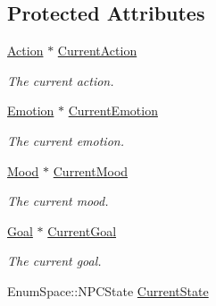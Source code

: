 \subsection*{Protected Attributes}
\begin{DoxyCompactItemize}
\item 
\hypertarget{class_n_p_c_a70f1d72ce96cfe4800a4bb7ce4cb4a8c}{\hyperlink{class_action}{Action} $\ast$ \hyperlink{class_n_p_c_a70f1d72ce96cfe4800a4bb7ce4cb4a8c}{Current\-Action}}\label{class_n_p_c_a70f1d72ce96cfe4800a4bb7ce4cb4a8c}

\begin{DoxyCompactList}\small\item\em The current action. \end{DoxyCompactList}\item 
\hypertarget{class_n_p_c_aacdb21f730d86fb68b70f88bf4a1eefe}{\hyperlink{class_emotion}{Emotion} $\ast$ \hyperlink{class_n_p_c_aacdb21f730d86fb68b70f88bf4a1eefe}{Current\-Emotion}}\label{class_n_p_c_aacdb21f730d86fb68b70f88bf4a1eefe}

\begin{DoxyCompactList}\small\item\em The current emotion. \end{DoxyCompactList}\item 
\hypertarget{class_n_p_c_a46cedade10fa9f48531a52d5d1913b1b}{\hyperlink{class_mood}{Mood} $\ast$ \hyperlink{class_n_p_c_a46cedade10fa9f48531a52d5d1913b1b}{Current\-Mood}}\label{class_n_p_c_a46cedade10fa9f48531a52d5d1913b1b}

\begin{DoxyCompactList}\small\item\em The current mood. \end{DoxyCompactList}\item 
\hypertarget{class_n_p_c_a44a39ba5690ce740a814b8f925c74165}{\hyperlink{class_goal}{Goal} $\ast$ \hyperlink{class_n_p_c_a44a39ba5690ce740a814b8f925c74165}{Current\-Goal}}\label{class_n_p_c_a44a39ba5690ce740a814b8f925c74165}

\begin{DoxyCompactList}\small\item\em The current goal. \end{DoxyCompactList}\item 
\hypertarget{class_n_p_c_a3593aab52251644d5aa4996452fc5d27}{Enum\-Space\-::\-N\-P\-C\-State \hyperlink{class_n_p_c_a3593aab52251644d5aa4996452fc5d27}{Current\-State}}\label{class_n_p_c_a3593aab52251644d5aa4996452fc5d27}


\end{DoxyCompactItemize}
